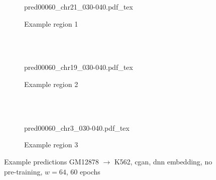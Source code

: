 \begin{figure}[p] %
    \begin{subfigure}{\textwidth}
        \centering
        \scriptsize
        {pred00060_chr21_030-040.pdf_tex}
        \caption{Example  region 1} \label{fig:results:cGAN64-dnn_r1}
    \end{subfigure}\\[2mm]
    \\[3mm]
    \begin{subfigure}{\textwidth}
        \centering
        \scriptsize
        {pred00060_chr19_030-040.pdf_tex}
        \caption{Example region 2} \label{fig:results:cGAN64-dnn_r2}
    \end{subfigure}\\[2mm]
    \\[3mm]
    \begin{subfigure}{\textwidth}
        \centering
        \scriptsize
        {pred00060_chr3_030-040.pdf_tex}
        \caption{Example region 3} \label{fig:results:cGAN64-dnn_r3}
    \end{subfigure}
    \caption{Example predictions GM12878 $\rightarrow$ K562, \acrshort{cgan}, \acrshort{dnn} embedding, no pre-training, $w=64$, 60 epochs} \label{fig:results:cGAN64-dnn_matrices}
\end{figure}
